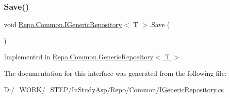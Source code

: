 \subsubsection{\texorpdfstring{Save()}{Save()}}
{\footnotesize\ttfamily void \hyperlink{interface_repo_1_1_common_1_1_i_generic_repository}{Repo.\+Common.\+I\+Generic\+Repository}$<$ T $>$.Save (\begin{DoxyParamCaption}{ }\end{DoxyParamCaption})}



Implemented in \hyperlink{class_repo_1_1_common_1_1_generic_repository_ab66ace5b2cc69867ce37dc996fc6c6e8}{Repo.\+Common.\+Generic\+Repository$<$ T $>$}.



The documentation for this interface was generated from the following file\+:\begin{DoxyCompactItemize}
\item 
D\+:/\+\_\+\+W\+O\+R\+K/\+\_\+\+S\+T\+E\+P/\+In\+Study\+Asp/\+Repo/\+Common/\hyperlink{_i_generic_repository_8cs}{I\+Generic\+Repository.\+cs}\end{DoxyCompactItemize}
